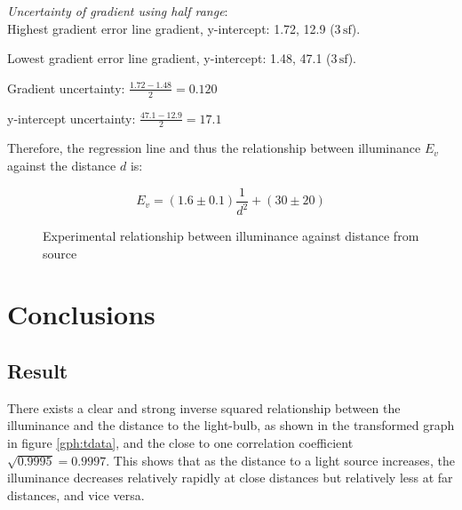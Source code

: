 \documentclass[a4paper,12pt]{article}
\newcommand{\tsf}{\,\text{sf}}
\begin{document}
\textit{Uncertainty of gradient using half range}:\\
Highest gradient error line gradient, y-intercept: 1.72, 12.9 ($3 \tsf$).

Lowest gradient error line gradient, y-intercept: 1.48, 47.1 ($3 \tsf$).

Gradient uncertainty: $\frac{1.72-1.48}{2} = 0.120$

y-intercept uncertainty: $\frac{47.1-12.9}{2} = 17.1$

Therefore, the regression line and thus the relationship between illuminance $E_v$ against the distance $d$ is:

\begin{figure}[h!]
    \[
       E_v = (1.6 \pm 0.1) \frac{1}{d^2} + (30 \pm 20)
    \]
    \caption{Experimental relationship between illuminance against distance from source}
    \label{fig:rel}
\end{figure}


\section{Conclusions}
\subsection{Result}

There exists a clear and strong inverse squared relationship between the illuminance and the distance to the light-bulb, as shown in the transformed graph in figure \ref{gph:tdata}, and the close to one correlation coefficient $\sqrt{0.9995}=0.9997$. This shows that as the distance to a light source increases, the illuminance decreases relatively rapidly at close distances but relatively less at far distances, and vice versa.
\end{document}
